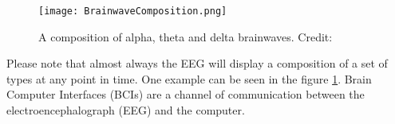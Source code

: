 \begin{figure}
  \centering
  \texttt{[image: BrainwaveComposition.png]}
  \caption{A composition of alpha, theta and delta brainwaves. Credit: \cite{gall1992method}}
    \label{fig:brainwaveComposition}        
\end{figure}

\vspace{5mm}

Please note that almost always the EEG will display a composition of a set of types at any point in time. One example can be seen in the figure \ref{fig:brainwaveComposition}. Brain Computer Interfaces (BCIs) are a channel of communication between the electroencephalograph (EEG) and the computer.

